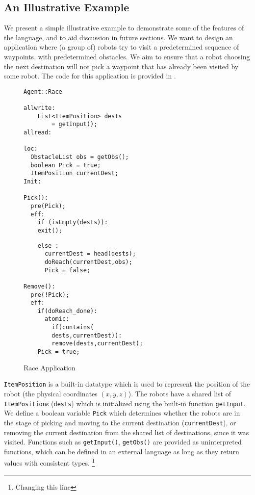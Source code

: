 \subsection[h]{An Illustrative Example}
\label{sect:Eg}
We present a simple illustrative example to demonstrate some of the features of the language, and to aid discussion in future sections. We want to design an application where (a group of) robots try to visit a predetermined sequence of waypoints, with predetermined obstacles. We aim to ensure that a robot choosing the next destination will not pick a waypoint that has already been visited by some robot. The code for this application is provided in .

\begin{figure}[ht!]
\label{fig:Race}
\noindent\begin{minipage}{.5\textwidth}

\begin{lstlisting}
Agent::Race

allwrite:
	List<ItemPosition> dests 
    	= getInput();
allread:

loc:
  ObstacleList obs = getObs();
  boolean Pick = true; 
  ItemPosition currentDest;
Init:

Pick():
  pre(Pick);
  eff:
    if (isEmpty(dests)):
    exit();   
 \end{lstlisting}
 \end{minipage}\hfill
\noindent\begin{minipage}{.5\textwidth}

\begin{lstlisting}
    else :
      currentDest = head(dests);
      doReach(currentDest,obs);
      Pick = false;
      
Remove():
  pre(!Pick);
  eff:
    if(doReach_done):
      atomic:
        if(contains(
        dests,currentDest)):
        remove(dests,currentDest);
    Pick = true;
 \end{lstlisting}
 \end{minipage}\hfill
 \caption{Race Application}
 \end{figure}
\verb|ItemPosition| is a built-in datatype which is used to represent the position of the robot (the physical coordinates $(x,y,z)$). The robots have a shared list of \verb|ItemPosition|s (\verb|dests|) which is initialized using the built-in function \verb|getInput|. We define a boolean variable \verb|Pick| which determines whether the robots are in the stage of picking and moving to the current destination (\verb|currentDest|), or removing the current destination from the shared list of destinations, since it was visited. Functions such as \verb|getInput()|, \verb|getObs()| are provided as uninterpreted functions, which can be defined in an external language as long as they return values with consistent types. \footnote{Changing this line}

